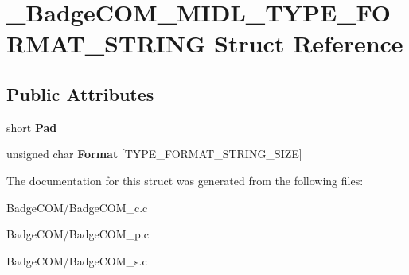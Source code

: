 \hypertarget{struct___badge_c_o_m___m_i_d_l___t_y_p_e___f_o_r_m_a_t___s_t_r_i_n_g}{\section{\-\_\-\-Badge\-C\-O\-M\-\_\-\-M\-I\-D\-L\-\_\-\-T\-Y\-P\-E\-\_\-\-F\-O\-R\-M\-A\-T\-\_\-\-S\-T\-R\-I\-N\-G Struct Reference}
\label{struct___badge_c_o_m___m_i_d_l___t_y_p_e___f_o_r_m_a_t___s_t_r_i_n_g}
}
\subsection*{Public Attributes}
\begin{DoxyCompactItemize}
\item 
\hypertarget{struct___badge_c_o_m___m_i_d_l___t_y_p_e___f_o_r_m_a_t___s_t_r_i_n_g_aafccb222f36e3284bd1bc63499498892}{short {\bfseries Pad}}\label{struct___badge_c_o_m___m_i_d_l___t_y_p_e___f_o_r_m_a_t___s_t_r_i_n_g_aafccb222f36e3284bd1bc63499498892}

\item 
\hypertarget{struct___badge_c_o_m___m_i_d_l___t_y_p_e___f_o_r_m_a_t___s_t_r_i_n_g_af811423dcf61b8c73e9628dbebdf7688}{unsigned char {\bfseries Format} \mbox{[}T\-Y\-P\-E\-\_\-\-F\-O\-R\-M\-A\-T\-\_\-\-S\-T\-R\-I\-N\-G\-\_\-\-S\-I\-Z\-E\mbox{]}}\label{struct___badge_c_o_m___m_i_d_l___t_y_p_e___f_o_r_m_a_t___s_t_r_i_n_g_af811423dcf61b8c73e9628dbebdf7688}

\end{DoxyCompactItemize}


The documentation for this struct was generated from the following files\-:\begin{DoxyCompactItemize}
\item 
Badge\-C\-O\-M/Badge\-C\-O\-M\-\_\-c.\-c\item 
Badge\-C\-O\-M/Badge\-C\-O\-M\-\_\-p.\-c\item 
Badge\-C\-O\-M/Badge\-C\-O\-M\-\_\-s.\-c\end{DoxyCompactItemize}

